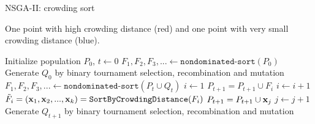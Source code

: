 \begin{frame}[allowframebreaks]{NSGA-II: crowding sort}
\begin{footnotesize}
One point with high crowding distance (red) and one point with very small crowding distance (blue).
\end{footnotesize}

\framebreak
\begin{algorithm}[H]

  \begin{center}
  \caption{NSGA-II}
    \begin{algorithmic}[1]
   	\begin{footnotesize}
    \STATE Initialize population $P_0$, $t \leftarrow 0$
    \STATE $F_1, F_2, F_3, ... \leftarrow \texttt{nondominated-sort}(P_0)$
    \STATE Generate $Q_0$ by binary tournament selection, recombination and mutation
      \REPEAT
        \STATE $F_1, F_2, F_3, ... \leftarrow \texttt{nondominated-sort}(P_t \cup Q_t)$
        \STATE $i \leftarrow 1$
        	\STATE $P_{t + 1} = P_{t + 1} \cup F_i$
        	\STATE $i \leftarrow i + 1$
    	\ENDWHILE
        \STATE $\tilde F_i = (\mathbf{x}_1, \mathbf{x}_2, ..., \mathbf{x}_k)= \texttt{SortByCrowdingDistance}(F_i)$
        	\STATE $P_{t + 1} = P_{t + 1} \cup \mathbf{x}_j$
        	\STATE $j \leftarrow j + 1$
        \ENDWHILE
        \STATE Generate $Q_{t + 1}$ by binary tournament selection, recombination and mutation
      \vspace*{-0.3cm}
      \end{footnotesize}
    \end{algorithmic}
    \end{center}
\end{algorithm}

\end{frame}







